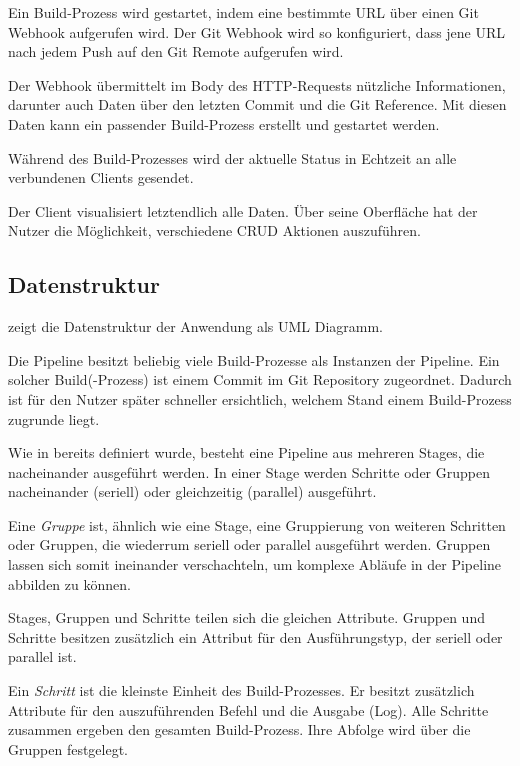 Ein Build-Prozess wird gestartet, indem eine bestimmte URL über einen Git Webhook aufgerufen wird. Der Git Webhook wird so konfiguriert, dass jene URL nach jedem Push auf den Git Remote aufgerufen wird.

Der Webhook übermittelt im Body des HTTP-Requests nützliche Informationen, darunter auch Daten über den letzten Commit und die Git Reference. Mit diesen Daten kann ein passender Build-Prozess erstellt und gestartet werden.

Während des Build-Prozesses wird der aktuelle Status in Echtzeit an alle verbundenen Clients gesendet.

Der Client visualisiert letztendlich alle Daten. Über seine Oberfläche hat der Nutzer die Möglichkeit, verschiedene \ac{CRUD} Aktionen auszuführen.

\subsection{Datenstruktur}
\label{subsec:uml}

 zeigt die Datenstruktur der Anwendung als UML Diagramm.

Die Pipeline besitzt beliebig viele Build-Prozesse als Instanzen der Pipeline. Ein solcher Build(-Prozess) ist einem Commit im Git Repository zugeordnet. Dadurch ist für den Nutzer später schneller ersichtlich, welchem Stand einem Build-Prozess zugrunde liegt.

Wie in  bereits definiert wurde, besteht eine Pipeline aus mehreren Stages, die nacheinander ausgeführt werden. In einer Stage werden Schritte oder Gruppen nacheinander (seriell) oder gleichzeitig (parallel) ausgeführt.

Eine \emph{Gruppe} ist, ähnlich wie eine Stage, eine Gruppierung von weiteren Schritten oder Gruppen, die wiederrum seriell oder parallel ausgeführt werden. Gruppen lassen sich somit ineinander verschachteln, um komplexe Abläufe in der Pipeline abbilden zu können.

Stages, Gruppen und Schritte teilen sich die gleichen Attribute. Gruppen und Schritte besitzen zusätzlich ein Attribut für den Ausführungstyp, der seriell oder parallel ist.

Ein \emph{Schritt} ist die kleinste Einheit des Build-Prozesses. Er besitzt zusätzlich Attribute für den auszuführenden Befehl und die Ausgabe (Log). Alle Schritte zusammen ergeben den gesamten Build-Prozess. Ihre Abfolge wird über die Gruppen festgelegt.

